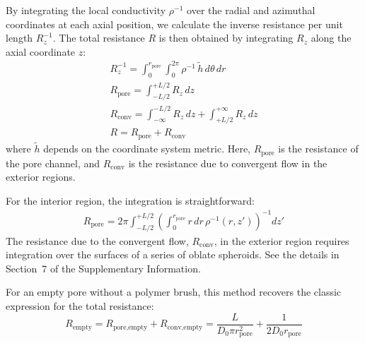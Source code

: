 \documentclass[12pt, a4paper]{article}
\begin{document}
By integrating the local conductivity $\rho^{-1}$ over the radial and azimuthal coordinates at each axial position, we calculate the inverse resistance per unit length $R_z^{-1}$.
The total resistance $R$ is then obtained by integrating $R_z$ along the axial coordinate $z$:
\begin{eqnarray}
    R_z^{-1} = \int_{0}^{r_{\text{pore}}}\int_{0}^{2\pi}\rho^{-1} \, \tilde{h} \, d\theta \, dr\\
    R_{\text{pore}} = \int_{-L/2}^{+L/2} R_z \, dz\\
    R_{\text{conv}} = \int_{-\infty}^{-L/2} R_z \, dz + \int_{+L/2}^{+\infty} R_z \, dz\\
    R = R_{\text{pore}} + R_{\text{conv}}
\end{eqnarray}
where $\tilde{h}$ depends on the coordinate system metric. Here, $R_{\textrm{pore}}$ is the resistance of the pore channel, and $R_{\textrm{conv}}$ is the resistance due to convergent flow in the exterior regions.


For the interior region, the integration is straightforward:
\begin{eqnarray}
    R_{\text{pore}} = 2\pi\int_{-L/2}^{+L/2}\left(\int_{0}^{r_{\text{pore}}} r \, dr \, \rho^{-1}(r, z')\right)^{-1} dz'
    \label{eq:R_pore}
\end{eqnarray}
The resistance due to the convergent flow, $R_{\text{conv}}$, in the exterior region requires integration over the surfaces of a series of oblate spheroids. 
See the details in Section~7 of the Supplementary Information.

For an empty pore without a polymer brush, this method recovers the classic expression for the total resistance:
\begin{equation} 
    R_{\textrm{empty}} = R_{\textrm{pore,empty}} + R_{\textrm{conv,empty}} = \frac{L}{D_0 \pi r_{\textrm{pore}}^2} + \frac{1}{2 D_0 r_{\textrm{pore}}}
\end{equation}
\end{document}

